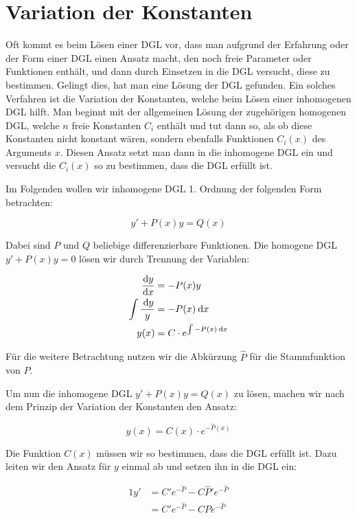 \section{Variation der Konstanten}

Oft kommt es beim Lösen einer DGL vor, dass man aufgrund der Erfahrung oder der Form einer DGL einen Ansatz macht, den noch freie Parameter oder Funktionen enthält, und dann durch Einsetzen in die DGL versucht, diese zu bestimmen. Gelingt dies, hat man eine Lösung der DGL gefunden. Ein solches Verfahren ist die Variation der Konstanten, welche beim Lösen einer inhomogenen DGL hilft. Man beginnt mit der allgemeinen Lösung der zugehörigen homogenen DGL, welche $n$ freie Konstanten $C_i$ enthält und tut dann so, als ob diese Konstanten nicht konstant wären, sondern ebenfalls Funktionen $C_i(x)$ des Arguments $x$. Diesen Ansatz setzt man dann in die inhomogene DGL ein und versucht die $C_i(x)$ so zu bestimmen, dass die DGL erfüllt ist.

Im Folgenden wollen wir inhomogene DGL 1. Ordnung der folgenden Form betrachten:

$$
    y'+P(x)y=Q(x)
$$

Dabei sind $P$ und $Q$ beliebige differenzierbare Funktionen. Die homogene DGL $y'+P(x)y=0$ lösen wir durch Trennung der Variablen:

\begin{alignat*}{1}
    \frac{\mathrm{d}{y}}{\mathrm{d}{x}}               &= -P(x) y \\
    \int \frac{\:\mathrm{d}{y}}{y} &= -P(x) \:\mathrm{d}{x} \\
    y(x)                    &= C \cdot e^{\int -P(x) \:\mathrm{d}{x}}
\end{alignat*}

Für die weitere Betrachtung nutzen wir die Abkürzung $\hat{P}$ für die Stammfunktion von $P$.

Um nun die inhomogene DGL $y'+P(x)y=Q(x)$ zu lösen, machen wir nach dem Prinzip der Variation der Konstanten den Ansatz:

$$
    y(x) = C(x) \cdot e^{-\hat{P}(x)}
$$

Die Funktion $C(x)$ müssen wir so bestimmen, dass die DGL erfüllt ist. Dazu leiten wir den Ansatz für $y$ einmal ab und setzen ihn in die DGL ein:

\begin{alignat*}{1}
    y' &= C' e^{-\hat{P}} - C \hat{P}' e^{-\hat{P}} \\
       &= C' e^{-\hat{P}} - C P e^{-\hat{P}}
\end{alignat*}

